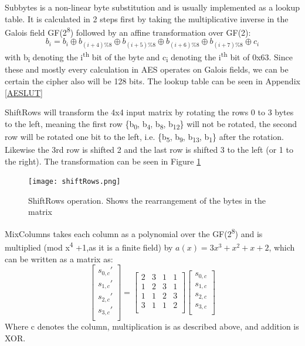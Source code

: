 \documentclass[a4paper]{article}
\begin{document}
Subbytes is a non-linear byte substitution and is usually implemented as a lookup table. It is calculated in 2 steps first by taking the multiplicative inverse in the Galois field GF(2\textsuperscript{8}) followed by an affine transformation over GF(2):
\[b_i = b_i \oplus b_{(i+4) \% 8} \oplus b_{(i+5) \% 8} \oplus b_{(i+6) \% 8} \oplus b_{(i+7) \% 8} \oplus c_i \] with b\textsubscript{i} denoting the i\textsuperscript{th} bit of the byte and c\textsubscript{i} denoting the i\textsuperscript{th} bit of 0x63. Since these and mostly every calculation in AES operates on Galois fields, we can be certain the cipher also will be 128 bits. The lookup table can be seen in Appendix \ref{AESLUT}

ShiftRows will transform the 4x4 input matrix by rotating the rows 0 to 3 bytes to the left, meaning the first row \{b\textsubscript{0}, b\textsubscript{4}, b\textsubscript{8}, b\textsubscript{12}\} will not be rotated, the second row will be rotated one bit to the left, i.e. \{b\textsubscript{5}, b\textsubscript{9}, b\textsubscript{13}, b\textsubscript{1}\} after the rotation. Likewise the 3rd row is shifted 2 and the last row is shifted 3 to the left (or 1 to the right). The transformation can be seen in Figure \ref{fig:ShiftRows}


\begin{figure}[!htb]
\centering
\texttt{[image: shiftRows.png]}
\caption[ShiftRows operation]{ShiftRows operation. Shows the rearrangement of the bytes in the matrix}
\label{fig:ShiftRows}
\end{figure}

MixColumns takes each column as a polynomial over the GF(2\textsuperscript{8}) and is multiplied (mod x\textsuperscript{4} +1,as it is a finite field) by \(a(x) = 3x^3 + x^2 + x + 2\), which can be written as a matrix as:
\[
\begin{bmatrix}
 s_{0,c}' \\
 s_{1,c}' \\
 s_{2,c}' \\
 s_{3,c}' \\
\end{bmatrix}=
\begin{bmatrix}
 2 & 3 & 1 & 1 \\
 1 & 2 & 3 & 1 \\
 1 & 1 & 2 & 3 \\
 3 & 1 & 1 & 2 \\
\end{bmatrix}
\begin{bmatrix}
 s_{0,c} \\
 s_{1,c} \\
 s_{2,c} \\
 s_{3,c} \\
\end{bmatrix}
\]
Where c denotes the column, multiplication is as described above, and addition is XOR.
\end{document}
